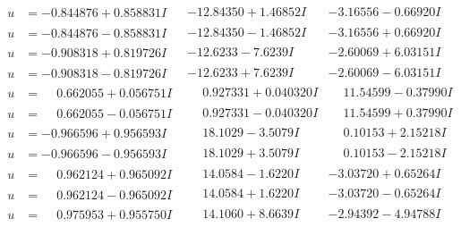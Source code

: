 \documentclass[1p]{elsarticle_modified}
\theoremstyle{definition}
\begin{document}
$$\begin{array}{c|c|c}
\begin{aligned}
u &= -0.844876 + 0.858831 I\end{aligned}
 & -12.84350 + 1.46852 I & -3.16556 - 0.66920 I \\ \hline\begin{aligned}
u &= -0.844876 - 0.858831 I\end{aligned}
 & -12.84350 - 1.46852 I & -3.16556 + 0.66920 I \\ \hline\begin{aligned}
u &= -0.908318 + 0.819726 I\end{aligned}
 & -12.6233 - 7.6239 I & -2.60069 + 6.03151 I \\ \hline\begin{aligned}
u &= -0.908318 - 0.819726 I\end{aligned}
 & -12.6233 + 7.6239 I & -2.60069 - 6.03151 I \\ \hline\begin{aligned}
u &= \phantom{-}0.662055 + 0.056751 I\end{aligned}
 & \phantom{-}0.927331 + 0.040320 I & \phantom{-}11.54599 - 0.37990 I \\ \hline\begin{aligned}
u &= \phantom{-}0.662055 - 0.056751 I\end{aligned}
 & \phantom{-}0.927331 - 0.040320 I & \phantom{-}11.54599 + 0.37990 I \\ \hline\begin{aligned}
u &= -0.966596 + 0.956593 I\end{aligned}
 & \phantom{-}18.1029 - 3.5079 I & \phantom{-}0.10153 + 2.15218 I \\ \hline\begin{aligned}
u &= -0.966596 - 0.956593 I\end{aligned}
 & \phantom{-}18.1029 + 3.5079 I & \phantom{-}0.10153 - 2.15218 I \\ \hline\begin{aligned}
u &= \phantom{-}0.962124 + 0.965092 I\end{aligned}
 & \phantom{-}14.0584 - 1.6220 I & -3.03720 + 0.65264 I \\ \hline\begin{aligned}
u &= \phantom{-}0.962124 - 0.965092 I\end{aligned}
 & \phantom{-}14.0584 + 1.6220 I & -3.03720 - 0.65264 I \\ \hline\begin{aligned}
u &= \phantom{-}0.975953 + 0.955750 I\end{aligned}
 & \phantom{-}14.1060 + 8.6639 I & -2.94392 - 4.94788 I \\ \hline\begin{aligned}

\end{aligned}
\end{array}$$
\end{document}
